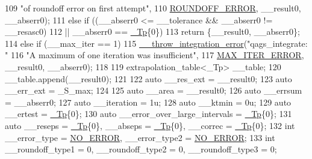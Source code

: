 \begin{DoxyCode}
109                                   \textcolor{stringliteral}{"of roundoff error on first attempt"},
110                                   \hyperlink{namespace____gnu__cxx_ad6c62dd86a596716cece6ac2d4cfd4b3a29574de87143c7715e9a138d7340e8ae}{ROUNDOFF\_ERROR}, \_\_result0, \_\_abserr0);
111       \textcolor{keywordflow}{else} \textcolor{keywordflow}{if} ((\_\_abserr0 <= \_\_tolerance && \_\_abserr0 != \_\_resasc0)
112                 || \_\_abserr0 == \hyperlink{namespace____gnu__cxx_a3b19a9c800ca194374ef9172290f7d79}{\_Tp}\{0\})
113         \textcolor{keywordflow}{return} \{\_\_result0, \_\_abserr0\};
114       \textcolor{keywordflow}{else} \textcolor{keywordflow}{if} (\_\_max\_iter == 1)
115         \hyperlink{namespace____gnu__cxx_a2ae22137ca092b8ae10f4d42b4e32cfb}{\_\_throw\_integration\_error}(\textcolor{stringliteral}{"qags\_integrate: "}
116                                   \textcolor{stringliteral}{"A maximum of one iteration was insufficient"},
117                                   \hyperlink{namespace____gnu__cxx_ad6c62dd86a596716cece6ac2d4cfd4b3a420d46d10205dd953d0ccce5323afc4c}{MAX\_ITER\_ERROR}, \_\_result0, \_\_abserr0);
118 
119       extrapolation\_table<\_Tp> \_\_table;
120       \_\_table.append(\_\_result0);
121 
122       \textcolor{keyword}{auto} \_\_res\_ext = \_\_result0;
123       \textcolor{keyword}{auto} \_\_err\_ext = \_S\_max;
124 
125       \textcolor{keyword}{auto} \_\_area = \_\_result0;
126       \textcolor{keyword}{auto} \_\_errsum = \_\_abserr0;
127       \textcolor{keyword}{auto} \_\_iteration = 1u;
128       \textcolor{keyword}{auto} \_\_ktmin = 0u;
129       \textcolor{keyword}{auto} \_\_ertest = \hyperlink{namespace____gnu__cxx_a3b19a9c800ca194374ef9172290f7d79}{\_Tp}\{0\};
130       \textcolor{keyword}{auto} \_\_error\_over\_large\_intervals = \hyperlink{namespace____gnu__cxx_a3b19a9c800ca194374ef9172290f7d79}{\_Tp}\{0\};
131       \textcolor{keyword}{auto} \_\_reseps = \hyperlink{namespace____gnu__cxx_a3b19a9c800ca194374ef9172290f7d79}{\_Tp}\{0\}, \_\_abseps = \hyperlink{namespace____gnu__cxx_a3b19a9c800ca194374ef9172290f7d79}{\_Tp}\{0\}, \_\_correc = \hyperlink{namespace____gnu__cxx_a3b19a9c800ca194374ef9172290f7d79}{\_Tp}\{0\};
132       \textcolor{keywordtype}{int} \_\_error\_type = \hyperlink{namespace____gnu__cxx_ad6c62dd86a596716cece6ac2d4cfd4b3ac31eecc280b10dec2efb4a2216ccc2e0}{NO\_ERROR}, \_\_error\_type2 = \hyperlink{namespace____gnu__cxx_ad6c62dd86a596716cece6ac2d4cfd4b3ac31eecc280b10dec2efb4a2216ccc2e0}{NO\_ERROR};
133       \textcolor{keywordtype}{int} \_\_roundoff\_type1 = 0, \_\_roundoff\_type2 = 0, \_\_roundoff\_type3 = 0;

\end{DoxyCode}
